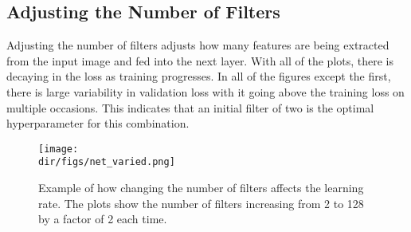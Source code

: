 \subsection{Adjusting the Number of Filters}
Adjusting the number of filters adjusts how many features are being extracted from the input image and fed into the next layer. With all of the plots, there is decaying in the loss as training progresses. In all of the figures except the first, there is large variability in validation loss with it going above the training loss on multiple occasions. This indicates that an initial filter of two is the optimal hyperparameter for this combination. 
\begin{figure}[htpb]
    \centering
    \texttt{[image: \\dir/figs/net\_varied.png]}
    \caption[Example of the affect of changing the number of filters in each Convolution layer]{Example of how changing the number of filters affects the learning rate. The plots show the number of filters increasing from 2 to 128 by a factor of 2 each time.}
    \label{fig.net_varied}
\end{figure}

